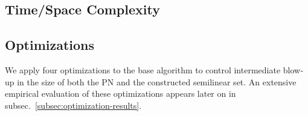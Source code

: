 





\subsection{Time/Space Complexity}



\subsection{Optimizations}
\label{sec:optimizations}


We apply four optimizations to the base algorithm to control intermediate blow‐up in the size of both the PN and the constructed semilinear set. 
%
An extensive empirical evaluation of these optimizations appears later on in subsec.~\ref{subsec:optimization-results}.

